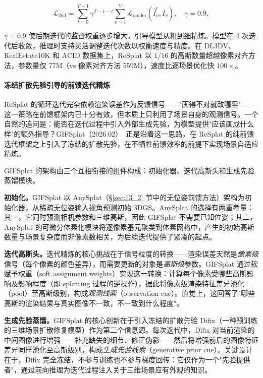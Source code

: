 \begin{equation}
\mathcal{L}_{2\text{nd}} = \sum_{t=0}^{T-1} \gamma^{T-1-t} \sum_{v=1}^{V} \mathcal{L}_{\text{render}}(\hat{I}_v^t, I_v), \quad \gamma=0.9,
\end{equation}

$\gamma=0.9$ 使后期迭代的监督权重逐步增大，引导模型从粗到细精炼。模型在 4 次迭代后收敛，推理时支持灵活调整迭代次数以权衡速度与精度。在 DL3DV、RealEstate10K 和 ACID 数据集上，ReSplat 以 $1/16$ 的高斯数量超越像素对齐方法，参数量仅 77M（vs 像素对齐方法 559M），速度比逐场景优化快 $100\times$。

\paragraph{冻结扩散先验引导的前馈迭代精炼}

ReSplat 的循环迭代完全依赖渲染误差作为反馈信号——"画得不对就改哪里"——这一策略在前馈框架内已十分有效，但本质上只利用了场景自身的观测信号。一个自然的追问是：能否在迭代过程中引入外部生成先验，为模型提供"应该画成什么样"的额外指导？GIFSplat（2026.02）~\cite{2602_22571}正是沿着这一思路，在 ReSplat 的纯前馈迭代框架之上引入了冻结的扩散先验，在不牺牲前馈效率的前提下实现场景自适应精炼。

GIFSplat 的架构由三个互相衔接的组件构成：初始化器、迭代高斯头和生成先验蒸馏模块。

\textbf{初始化。}GIFSplat 以 AnySplat（\S\ref{sec:13_2} 节中的无位姿前馈方法）架构为初始化器，从稀疏无位姿输入视角预测初始 3DGS。AnySplat 的选择有两重考量：其一，它同时预测相机参数和三维高斯，因此 GIFSplat 不需要已知位姿；其二，AnySplat 的可微分体素化模块将逐像素基元聚类到体素网格中，产生的初始高斯数量与场景复杂度而非像素数相关，为后续迭代提供了紧凑的起点。

\textbf{迭代高斯头。}迭代精炼的核心挑战在于信号粒度的转换——渲染误差天然是\emph{像素级}信号（每个像素的颜色差异），而需要更新的对象是\emph{高斯级}参数。GIFSplat 通过软赋予权重（soft assignment weights）实现这一转换：计算每个像素受哪些高斯影响及影响程度（即 splatting 过程的逆操作），据此将像素级渲染特征差异池化（pool）至高斯级别，构成\emph{观测线索}（observation cue）。直觉上，这回答了"哪些高斯的渲染结果与真实图像不一致，不一致到什么程度"。

\textbf{生成先验蒸馏。}GIFSplat 的核心创新在于引入冻结的扩散先验 Difix（一种预训练的三维场景扩散修复模型）作为第二个信息源。每次迭代中，Difix 对当前渲染的中间图像进行增强——补充缺失的细节、修正伪影——然后将增强前后的图像特征差异同样池化至高斯级别，构成\emph{生成先验线索}（generative prior cue）。关键设计在于，Difix 完全冻结，不参与训练也不参与梯度回传：它仅作为一个"先验提供者"，通过前向推理为迭代过程注入关于三维场景应有外观的知识。

